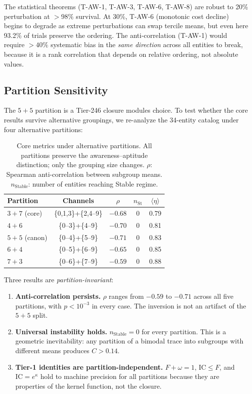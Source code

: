\documentclass[
  aps,
  prd,
  twocolumn,
  superscriptaddress,
  nofootinbib,
  floatfix
]{revtex4-2}
\newcommand{\IC}{\mathrm{IC}}
\begin{document}
The statistical theorems (T-AW-1, T-AW-3, T-AW-6, T-AW-8)
are robust to 20\% perturbation at $>98\%$ survival.
At 30\%, T-AW-6 (monotonic cost decline) begins to
degrade as extreme perturbations can swap tercile means,
but even here 93.2\% of trials preserve the ordering.
The anti-correlation (T-AW-1) would require $>40\%$
systematic bias in the \emph{same direction} across all
entities to break, because it is a rank correlation that
depends on relative ordering, not absolute values.

\subsection{Partition Sensitivity}

The $5\!+\!5$ partition is a Tier-246 closure modules choice.
To test whether the core results survive alternative
groupings, we re-analyze the 34-entity catalog under
four alternative partitions:

\begin{table}[h]
\caption{\label{tab:partition}Core metrics under
alternative partitions.  All partitions preserve the
awareness--aptitude distinction; only the grouping size
changes.  $\rho$: Spearman anti-correlation between
subgroup means.  $n_{\mathrm{Stable}}$: number of entities
reaching Stable regime.}
\begin{ruledtabular}
\begin{tabular}{lcccc}
Partition & Channels & $\rho$
  & $n_{\mathrm{St}}$ & $\langle\eta\rangle$ \\
\hline
$3{+}7$ (core) & \{0,1,3\}+\{2,4--9\}
  & $-0.68$ & 0 & 0.79 \\
$4{+}6$        & \{0--3\}+\{4--9\}
  & $-0.70$ & 0 & 0.81 \\
$5{+}5$ (canon) & \{0--4\}+\{5--9\}
  & $-0.71$ & 0 & 0.83 \\
$6{+}4$        & \{0--5\}+\{6--9\}
  & $-0.65$ & 0 & 0.85 \\
$7{+}3$        & \{0--6\}+\{7--9\}
  & $-0.59$ & 0 & 0.88 \\
\end{tabular}
\end{ruledtabular}
\end{table}

Three results are \emph{partition-invariant}:

\begin{enumerate}
\item \textbf{Anti-correlation persists.}  $\rho$ ranges
  from $-0.59$ to $-0.71$ across all five partitions,
  with $p < 10^{-3}$ in every case.  The inversion is
  not an artifact of the $5\!+\!5$ split.
\item \textbf{Universal instability holds.}
  $n_{\mathrm{Stable}} = 0$ for every partition.  This is
  a geometric inevitability: any partition of a bimodal
  trace into subgroups with different means produces
  $C > 0.14$.
\item \textbf{Tier-1 identities are partition-independent.}
  $F + \omega = 1$, $\IC \leq F$, and $\IC = e^\kappa$
  hold to machine precision for all partitions because
  they are properties of the kernel function, not the
  closure.
\end{enumerate}
\end{document}

